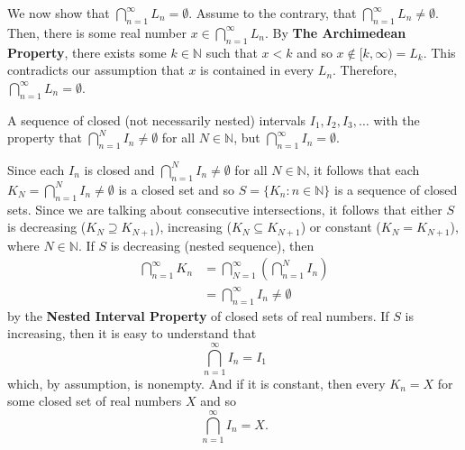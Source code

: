 \documentclass[12pt]{article}
\newcommand{\N}{\mathbb{N}}
\newenvironment{problem}[2][Problem]{\begin{trivlist}
		\item[\hskip \labelsep {\bfseries #1}\hskip \labelsep {\bfseries #2.}]}{\end{trivlist}}
\newenvironment{solution}[2][Solution]{\begin{trivlist}
		\item[\hskip \labelsep {\bfseries #1}\hskip \labelsep {\bfseries #2.}]}{\end{trivlist}}
\begin{document}
\begin{problem}{1.4.8}
\begin{enumerate}[label=(\alph*)]
\begin{solution}{(c)}
				We now show that $\bigcap_{n=1}^{\infty} L_{n} = \emptyset$. Assume to the contrary, that $\bigcap_{n=1}^{\infty} L_{n} \neq \emptyset$. Then, there is some real number $x\in \bigcap_{n=1}^{\infty} L_{n}$. By \textbf{The Archimedean Property}, there exists some $k\in \N$ such that $x<k$ and so $x\not\in [k,\infty) = L_{k}$. This contradicts our assumption that $x$ is contained in every $L_{n}$. Therefore, $\bigcap_{n=1}^{\infty} L_{n} = \emptyset$.
			\end{solution}
			\item A sequence of closed (not necessarily nested) intervals $I_{1},I_{2},I_{3},\ldots$ with the property that $\bigcap_{n=1}^{N} I_{n} \neq \emptyset$ for all $N\in \N$, but $\bigcap_{n=1}^{\infty} I_{n} = \emptyset$.
			\begin{solution}{(c)}
				Since each $I_{n}$ is closed and $\bigcap_{n=1}^{N} I_{n} \neq \emptyset$ for all $N\in \N$, it follows that each $K_{N} = \bigcap_{n=1}^{N} I_{n} \neq \emptyset$ is a closed set and so $S=\{K_{n}:n\in \N\}$ is a sequence of closed sets. Since we are talking about consecutive intersections, it follows that either $S$ is decreasing ($K_{N}\supseteq K_{N+1}$), increasing ($K_{N}\subseteq K_{N+1}$) or constant ($K_{N} = K_{N+1}$), where $N\in \N$. If $S$ is decreasing (nested sequence), then  
				\begin{align*}
					\bigcap_{n=1}^{\infty} K_{n} &= \bigcap_{N=1}^{\infty} \left(\bigcap_{n=1}^{N} I_{n}\right)\\
					&= \bigcap_{n=1}^{\infty}I_{n} \neq \emptyset 
				\end{align*} 
			by the \textbf{Nested Interval Property} of closed sets of  real numbers. If $S$ is increasing, then it is easy to understand that
			\begin{equation*}
				\bigcap_{n=1}^{\infty}I_{n} = I_{1}
			\end{equation*}
		which, by assumption, is nonempty. And if it is constant, then every $K_{n} = X$ for some closed set of real numbers $X$ and so
		\begin{equation*}
		\bigcap_{n=1}^{\infty}I_{n} = X.
		\end{equation*}
			\end{solution}
		\end{enumerate}
	\end{problem}
\end{document}
